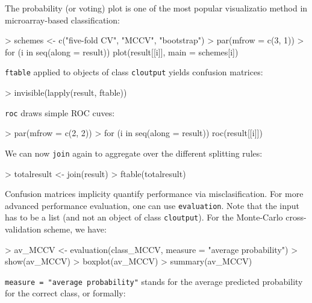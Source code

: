 The probability (or voting) plot is one of the most popular visualizatio method 
in microarray-based classification:

\begin{Schunk}
\begin{Sinput}
> schemes <- c("five-fold CV", "MCCV", "bootstrap")
> par(mfrow = c(3, 1))
> for (i in seq(along = result)) plot(result[[i]], main = schemes[i])
\end{Sinput}
\end{Schunk}

\texttt{ftable} applied to objects of class \texttt{cloutput} yields 
confusion matrices:

\begin{Schunk}
\begin{Sinput}
> invisible(lapply(result, ftable))
\end{Sinput}
\end{Schunk}
\texttt{roc} draws simple ROC cuves:

\begin{Schunk}
\begin{Sinput}
> par(mfrow = c(2, 2))
> for (i in seq(along = result)) roc(result[[i]])
\end{Sinput}
\end{Schunk}

We can now \texttt{join} again to aggregate over the different
splitting rules:

\begin{Schunk}
\begin{Sinput}
> totalresult <- join(result)
> ftable(totalresult)
\end{Sinput}
\end{Schunk}

Confusion matrices implicity quantify performance via
misclasification. For more advanced performance evaluation,
one can use \texttt{evaluation}. Note that the input has
to be a list (and not an object of class \texttt{cloutput}).
For the Monte-Carlo cross-validation scheme, we have:

\begin{Schunk}
\begin{Sinput}
> av_MCCV <- evaluation(class_MCCV, measure = "average probability")
> show(av_MCCV)
> boxplot(av_MCCV)
> summary(av_MCCV)
\end{Sinput}
\end{Schunk}

\texttt{measure = "average probability"} stands for the average predicted
probability for the correct class, or formally:


